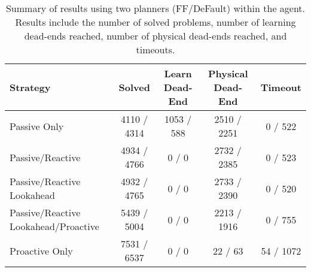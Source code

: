 \documentclass[letterpaper]{article}
\begin{document}
\begin{table*}\centering\begin{tabular}{|l|cccc|}\hline																	
Strategy	&	Solved			&	Learn Dead-End			&	Physical Dead-End			&	Timeout			\\\hline\hline
Passive Only	&	4110	/	4314	&	1053	/	588	&	2510	/	2251	&	0	/	522	\\
Passive/Reactive	&	4934	/	4766	&	0	/	0	&	2732	/	2385	&	0	/	523	\\
Passive/Reactive Lookahead	&	4932	/	4765	&	0	/	0	&	2733	/	2390	&	0	/	520	\\
Passive/Reactive Lookahead/Proactive	&	5439	/	5004	&	0	/	0	&	2213	/	1916	&	0	/
755	\\ Proactive Only	&	7531	/	6537	&	0	/	0	&	22	/	63	&	54	/	1072	\\\hline
\end{tabular}	\caption{\label{tab:t1} Summary of results using two planners
(FF/DeFault) within the agent.  Results include the number of solved problems, number of learning dead-ends reached, number of physical dead-ends reached, and timeouts.}	\end{table*}
\end{document}

